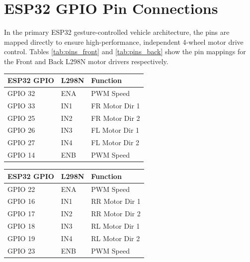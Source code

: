\documentclass[12pt,a4paper,oneside]{report}
\begin{document}
\section{ESP32 GPIO Pin Connections}
In the primary ESP32 gesture-controlled vehicle architecture, the pins are mapped directly to ensure high-performance, independent 4-wheel motor drive control. Tables \ref{tab:pins_front} and \ref{tab:pins_back} show the pin mappings for the Front and Back L298N motor drivers respectively.\par
\vspace{0.1in}
\begin{center}
\begin{minipage}{0.48\textwidth}
  \centering
  \fontsize{9.5}{11}\selectfont
  \begin{tabular}{|C{2.3cm}|C{2.0cm}|C{2.0cm}|}
  \hline
  \textbf{ESP32 GPIO} & \textbf{L298N} & \textbf{Function} \\ \hline
  GPIO 32 & ENA & PWM Speed \\ \hline
  GPIO 33 & IN1 & FR Motor Dir 1 \\ \hline
  GPIO 25 & IN2 & FR Motor Dir 2 \\ \hline
  GPIO 26 & IN3 & FL Motor Dir 1 \\ \hline
  GPIO 27 & IN4 & FL Motor Dir 2 \\ \hline
  GPIO 14 & ENB & PWM Speed \\ \hline
  \end{tabular}
  \vspace{0.05in}
  \label{tab:pins_front}
\end{minipage}
\hfill
\begin{minipage}{0.48\textwidth}
  \centering
  \fontsize{9.5}{11}\selectfont
  \begin{tabular}{|C{2.3cm}|C{2.0cm}|C{2.0cm}|}
  \hline
  \textbf{ESP32 GPIO} & \textbf{L298N} & \textbf{Function} \\ \hline
  GPIO 22 & ENA & PWM Speed \\ \hline
  GPIO 16 & IN1 & RR Motor Dir 1 \\ \hline
  GPIO 17 & IN2 & RR Motor Dir 2 \\ \hline
  GPIO 18 & IN3 & RL Motor Dir 1 \\ \hline
  GPIO 19 & IN4 & RL Motor Dir 2 \\ \hline
  GPIO 23 & ENB & PWM Speed \\ \hline
  \end{tabular}
  \vspace{0.05in}
  \label{tab:pins_back}
\end{minipage}
\end{center}
\end{document}
